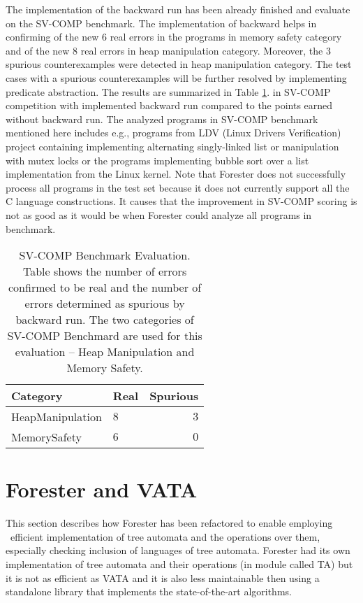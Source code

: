 \documentclass[fleqn,11pt]{ExcelAtFIT} %
\begin{document}
The implementation of the backward run has been already finished and evaluate on the SV-COMP benchmark.
The implementation of backward helps in confirming of the new $6$ real errors in the programs in memory safety category and
of the new $8$ real errors in heap manipulation category.
Moreover, the $3$ spurious counterexamples were detected in heap manipulation category.
The test cases with a spurious counterexamples will be further resolved by implementing predicate
abstraction.
The results are summarized in Table \ref{tab:bwres}.
in SV-COMP competition with implemented backward run compared to the points earned without backward run.
The analyzed programs in SV-COMP benchmark mentioned here includes e.g., programs from LDV (Linux Drivers Verification) project
containing implementing alternating singly-linked list or manipulation with mutex locks or the programs
implementing bubble sort over a list implementation from the Linux kernel.
Note that Forester does not successfully process all programs in the test set
because it does not currently support all the C language constructions.
It causes that the improvement in SV-COMP scoring is not as good as it would be when
Forester could analyze all programs in benchmark.

\begin{table}[bu]
	\vskip6pt
	\caption{SV-COMP Benchmark Evaluation. Table shows the number of errors confirmed
	to be real and the number of errors determined as spurious by backward run.
	The two categories of SV-COMP Benchmard are used for this evaluation -- Heap Manipulation and Memory Safety.}
	\centering
	\begin{tabular}{llr}
		\toprule
		Category & Real & Spurious \\
		\midrule
		HeapManipulation & $8$ & $3$ \\
		MemorySafety & $6$ & $0$ \\
		\bottomrule
	\end{tabular}
	\label{tab:bwres}
\end{table}


\section{Forester and VATA}
\label{sec:forvata}

This section describes how Forester has been refactored to enable employing \vata\ 
efficient implementation of	tree automata and the operations over them,
especially checking inclusion of languages of tree automata.
Forester had its own implementation of tree automata and their operations (in module called TA)
but it is not as efficient as VATA and it is also less maintainable
then using a standalone library that implements the state-of-the-art algorithms.
\end{document}
